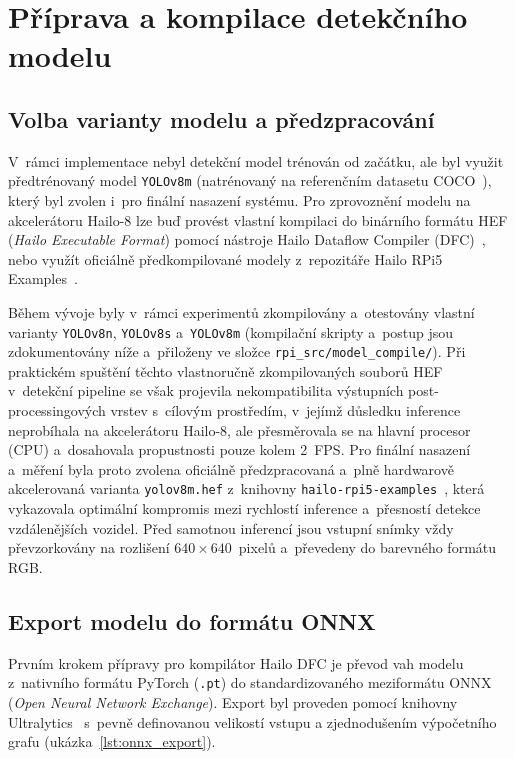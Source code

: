 \section{Příprava a kompilace detekčního modelu}
\subsection{Volba varianty modelu a předzpracování}

V~rámci implementace nebyl detekční model trénován od začátku, ale byl využit předtrénovaný model \texttt{YOLOv8m} (natrénovaný na referenčním datasetu \acs{COCO}~\cite{lin_coco_2014}), který byl zvolen i~pro finální nasazení systému. Pro zprovoznění modelu na akcelerátoru Hailo-8 lze buď provést vlastní kompilaci do binárního formátu HEF (\textit{Hailo Executable Format}) pomocí nástroje Hailo Dataflow Compiler (\acs{DFC})~\cite{hailo_dfc_docs}, nebo využít oficiálně předkompilované modely z~repozitáře Hailo RPi5 Examples~\cite{hailo_rpi5_examples}.

Během vývoje byly v~rámci experimentů zkompilovány a~otestovány vlastní varianty \texttt{YOLOv8n}, \texttt{YOLOv8s} a~\texttt{YOLOv8m} (kompilační skripty a~postup jsou zdokumentovány níže a~přiloženy ve složce \texttt{rpi\_src/model\_compile/}). Při praktickém spuštění těchto vlastnoručně zkompilovaných souborů HEF v~detekční pipeline se však projevila nekompatibilita výstupních post-processingových vrstev s~cílovým prostředím, v~jejímž důsledku inference neprobíhala na akcelerátoru Hailo-8, ale přesměrovala se na hlavní procesor (\acs{CPU}) a~dosahovala propustnosti pouze kolem 2~\acs{FPS}. Pro finální nasazení a~měření byla proto zvolena oficiálně předzpracovaná a~plně hardwarově akcelerovaná varianta \texttt{yolov8m.hef} z~knihovny \texttt{hailo-rpi5-examples}~\cite{hailo_rpi5_examples}, která vykazovala optimální kompromis mezi rychlostí inference a~přesností detekce vzdálenějších vozidel. Před samotnou inferencí jsou vstupní snímky vždy převzorkovány na rozlišení $640 \times 640$~pixelů a~převedeny do barevného formátu \acs{RGB}.

\subsection{Export modelu do formátu ONNX}
Prvním krokem přípravy pro kompilátor Hailo DFC je převod vah modelu z~nativního formátu PyTorch (\texttt{.pt}) do standardizovaného meziformátu ONNX (\textit{Open Neural Network Exchange}). Export byl proveden pomocí knihovny Ultralytics~\cite{ultralytics_yolov8_docs} s~pevně definovanou velikostí vstupu a zjednodušením výpočetního grafu (ukázka~\ref{lst:onnx_export}).


